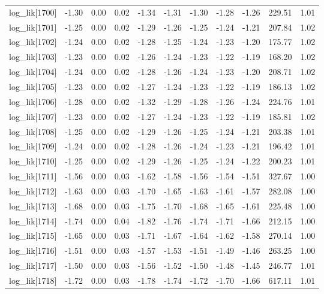 \begin{table}[ht]
\begin{tabular}{rrrrrrrrrrr}
  log\_lik[1700] & -1.30 & 0.00 & 0.02 & -1.34 & -1.31 & -1.30 & -1.28 & -1.26 & 229.51 & 1.01 \\ 
  log\_lik[1701] & -1.25 & 0.00 & 0.02 & -1.29 & -1.26 & -1.25 & -1.24 & -1.21 & 207.84 & 1.02 \\ 
  log\_lik[1702] & -1.24 & 0.00 & 0.02 & -1.28 & -1.25 & -1.24 & -1.23 & -1.20 & 175.77 & 1.02 \\ 
  log\_lik[1703] & -1.23 & 0.00 & 0.02 & -1.26 & -1.24 & -1.23 & -1.22 & -1.19 & 168.20 & 1.02 \\ 
  log\_lik[1704] & -1.24 & 0.00 & 0.02 & -1.28 & -1.26 & -1.24 & -1.23 & -1.20 & 208.71 & 1.02 \\ 
  log\_lik[1705] & -1.23 & 0.00 & 0.02 & -1.27 & -1.24 & -1.23 & -1.22 & -1.19 & 186.13 & 1.02 \\ 
  log\_lik[1706] & -1.28 & 0.00 & 0.02 & -1.32 & -1.29 & -1.28 & -1.26 & -1.24 & 224.76 & 1.01 \\ 
  log\_lik[1707] & -1.23 & 0.00 & 0.02 & -1.27 & -1.24 & -1.23 & -1.22 & -1.19 & 185.81 & 1.02 \\ 
  log\_lik[1708] & -1.25 & 0.00 & 0.02 & -1.29 & -1.26 & -1.25 & -1.24 & -1.21 & 203.38 & 1.01 \\ 
  log\_lik[1709] & -1.24 & 0.00 & 0.02 & -1.28 & -1.26 & -1.24 & -1.23 & -1.21 & 196.42 & 1.01 \\ 
  log\_lik[1710] & -1.25 & 0.00 & 0.02 & -1.29 & -1.26 & -1.25 & -1.24 & -1.22 & 200.23 & 1.01 \\ 
  log\_lik[1711] & -1.56 & 0.00 & 0.03 & -1.62 & -1.58 & -1.56 & -1.54 & -1.51 & 327.67 & 1.00 \\ 
  log\_lik[1712] & -1.63 & 0.00 & 0.03 & -1.70 & -1.65 & -1.63 & -1.61 & -1.57 & 282.08 & 1.00 \\ 
  log\_lik[1713] & -1.68 & 0.00 & 0.03 & -1.75 & -1.70 & -1.68 & -1.65 & -1.61 & 225.48 & 1.00 \\ 
  log\_lik[1714] & -1.74 & 0.00 & 0.04 & -1.82 & -1.76 & -1.74 & -1.71 & -1.66 & 212.15 & 1.00 \\ 
  log\_lik[1715] & -1.65 & 0.00 & 0.03 & -1.71 & -1.67 & -1.64 & -1.62 & -1.58 & 270.14 & 1.00 \\ 
  log\_lik[1716] & -1.51 & 0.00 & 0.03 & -1.57 & -1.53 & -1.51 & -1.49 & -1.46 & 263.25 & 1.00 \\ 
  log\_lik[1717] & -1.50 & 0.00 & 0.03 & -1.56 & -1.52 & -1.50 & -1.48 & -1.45 & 246.77 & 1.01 \\ 
  log\_lik[1718] & -1.72 & 0.00 & 0.03 & -1.78 & -1.74 & -1.72 & -1.70 & -1.66 & 617.11 & 1.01 \\ 

\end{tabular}
\end{table}
